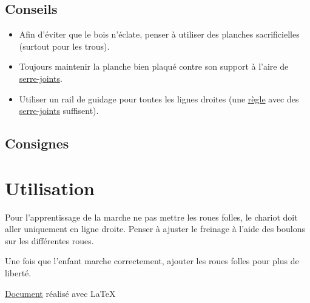 \documentclass[a4paper,oneside]{article}
\begin{document}
\subsection{Conseils}
\begin{itemize}
\item Afin d'éviter que le bois n'éclate, penser à utiliser des planches sacrificielles (surtout pour les trous).
\item Toujours maintenir la planche bien plaqué contre son support à l'aire de \href{http://www.leroymerlin.fr/v3/p/produits/serre-joint-1-main-dexter-300-mm-e51423}{serre-joints}.
\item Utiliser un rail de guidage pour toutes les lignes droites (une \href{http://www.leroymerlin.fr/v3/p/produits/regle-avec-embout-nespoli-150-cm-e67206}{règle} avec des \href{http://www.leroymerlin.fr/v3/p/produits/lot-de-serre-joints-a-cadre-5-mm-e51365}{serre-joints} suffisent).
\end{itemize}

\subsection{Consignes}


\section{Utilisation}

Pour l'apprentissage de la marche ne pas mettre les roues folles, le chariot doit aller uniquement en ligne droite.
Penser à ajuster le freinage à l'aide des boulons sur les différentes roues.

Une fois que l'enfant marche correctement, ajouter les roues folles pour plus de liberté.


\vfill
\hfill \small \href{https://github.com/lbaudouin/plans-bois/blob/master/chariot.tex}{Document} réalisé avec \LaTeX
\end{document}
